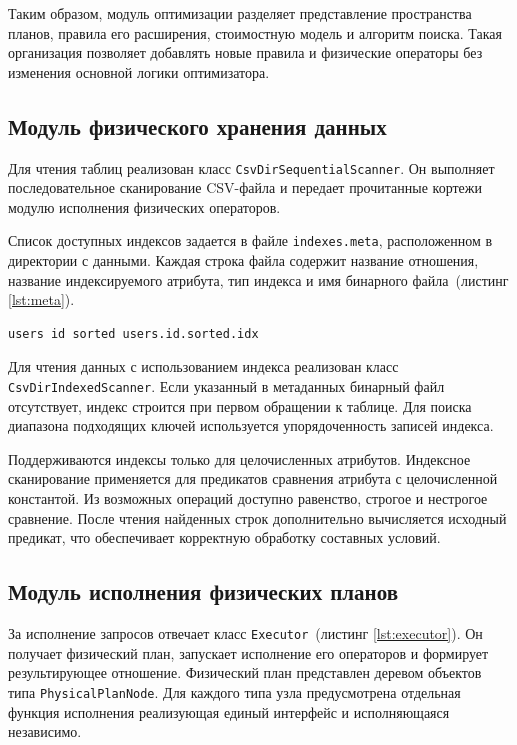\documentclass[14pt, russian]{scrartcl}
\newcommand{\refAlgo}[1]{(листинг \ref{#1})}
\begin{document}
Таким образом, модуль оптимизации разделяет представление пространства планов,
правила его расширения, стоимостную модель и алгоритм поиска. Такая организация
позволяет добавлять новые правила и физические операторы без изменения основной
логики оптимизатора.

\subsection{Модуль физического хранения данных}

Для чтения таблиц реализован класс \verb|CsvDirSequentialScanner|. Он выполняет
последовательное сканирование CSV-файла и передает прочитанные кортежи модулю
исполнения физических операторов.

Список доступных индексов задается в файле \verb|indexes.meta|,
расположенном в директории с данными. Каждая строка файла содержит
название отношения, название индексируемого атрибута, тип индекса и имя
бинарного файла~\refAlgo{lst:meta}.

\begin{listing}[H]
  \caption{Пример файла с метаданными о доступных индексах.}
  \label{lst:meta}
\begin{verbatim}
users id sorted users.id.sorted.idx
\end{verbatim}
\end{listing}

Для чтения данных с использованием индекса реализован класс
\verb|CsvDirIndexedScanner|. Если указанный в метаданных бинарный файл
отсутствует, индекс строится при первом обращении к таблице. Для поиска
диапазона подходящих ключей используется упорядоченность записей индекса.

Поддерживаются индексы только для целочисленных атрибутов. Индексное
сканирование применяется для предикатов сравнения атрибута с целочисленной
константой. Из возможных операций доступно равенство, строгое и нестрогое
сравнение. После чтения найденных строк дополнительно вычисляется исходный
предикат, что обеспечивает корректную обработку составных условий.

\subsection{Модуль исполнения физических планов}

За исполнение запросов отвечает класс \verb|Executor|~\refAlgo{lst:executor}. Он
получает физический план, запускает исполнение его операторов и формирует
результирующее отношение. Физический план представлен деревом объектов типа
\verb|PhysicalPlanNode|. Для каждого типа узла предусмотрена отдельная функция
исполнения реализующая единый интерфейс и исполняющаяся независимо.
\end{document}
